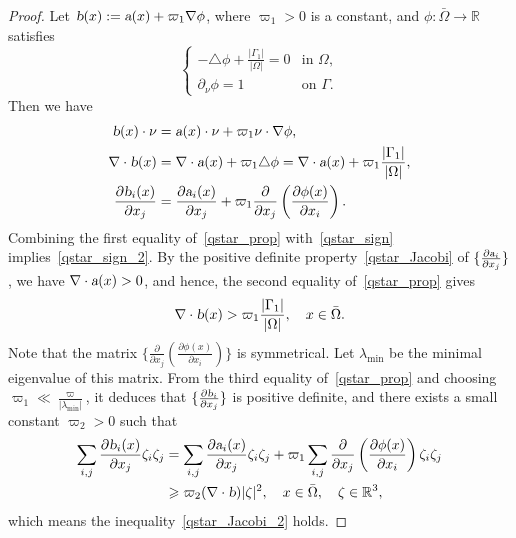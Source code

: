 \documentclass{elsarticle}
\begin{document}
\begin{proof}
Let $\textsl{b}(x) := \textsl{a}(x) + \varpi_1\nabla\phi$, where $\varpi_1 >0$ is a constant, and $\phi: \bar{\Omega}\rightarrow\mathbb{R}$ satisfies
\[
\left
    \{
        \begin{array}{rl}
            -\triangle\phi + \frac{|\Gamma_1|}{|\Omega|}= 0 & \textrm{in $\Omega$}, \\
                  \partial_{\nu}\phi = 1 & \textrm{on $\Gamma$}.
        \end{array}
\right.
\]
Then we have 
\begin{equation}\label{qstar_prop}
\begin{split}
\textsl{b}(x)\cdot\nu &= \textsl{a}(x)\cdot\nu + \varpi_1\nu\cdot\nabla\phi,\\
\nabla\cdot\textsl{b}(x) &=\nabla\cdot \textsl{a}(x) + \varpi_1\triangle\phi = \nabla\cdot \textsl{a}(x) + \varpi_1\frac{|\Gamma_1|}{|\Omega|},\\
\frac{\partial\textsl{b}_i(x)}{\partial x_j} &= \frac{\partial\textsl{a}_i(x)}{\partial x_j} + \varpi_1\frac{\partial}{\partial x_j}\left(\frac{\partial\phi(x)}{\partial x_i}\right).
\end{split}
\end{equation}
Combining the first equality of~\eqref{qstar_prop} with~\eqref{qstar_sign} implies~\eqref{qstar_sign_2}. By the positive definite property~\eqref{qstar_Jacobi} of $\{\frac{\partial \textsl{a}_{i}}{\partial x_j}\}$, we have $\nabla\cdot \textsl{a}(x) >0$, and hence, the second equality of~\eqref{qstar_prop} gives
\[
\nabla\cdot\textsl{b}(x) > \varpi_1\frac{|\Gamma_1|}{|\Omega|}, \quad x\in\bar{\Omega}.
\]
Note that the matrix $\{\frac{\partial}{\partial x_j}\left(\frac{\partial\phi(x)}{\partial x_i}\right)\}$ is symmetrical. Let $\lambda_{\mathrm{min}}$ be the minimal eigenvalue of this matrix. From the third equality of~\eqref{qstar_prop} and choosing $\varpi_1\ll \frac{\varpi}{|\lambda_{\mathrm{min}}|}$, it deduces that $\{\frac{\partial \textsl{b}_{i}}{\partial x_j}\}$ is positive definite, and there exists a small constant $\varpi_2>0$ such that 
	\begin{equation*}
	\begin{split}
		\sum_{i, j}\frac{\partial \textsl{b}_{i}(x)}{\partial x_j}\zeta_i\zeta_j &= \sum_{i, j}\frac{\partial \textsl{a}_{i}(x)}{\partial x_j}\zeta_i\zeta_j + \varpi_1\sum_{i, j}\frac{\partial}{\partial x_j}\left(\frac{\partial\phi(x)}{\partial x_i}\right)\zeta_i\zeta_j\\
		&\geqslant \varpi_2(\nabla\cdot\textsl{b})|\zeta|^2,\quad x\in\bar{\Omega}, \quad \zeta\in\mathbb{R}^3,
	\end{split}
	\end{equation*}
which means the inequality~\eqref{qstar_Jacobi_2} holds.
\end{proof}
\end{document}
